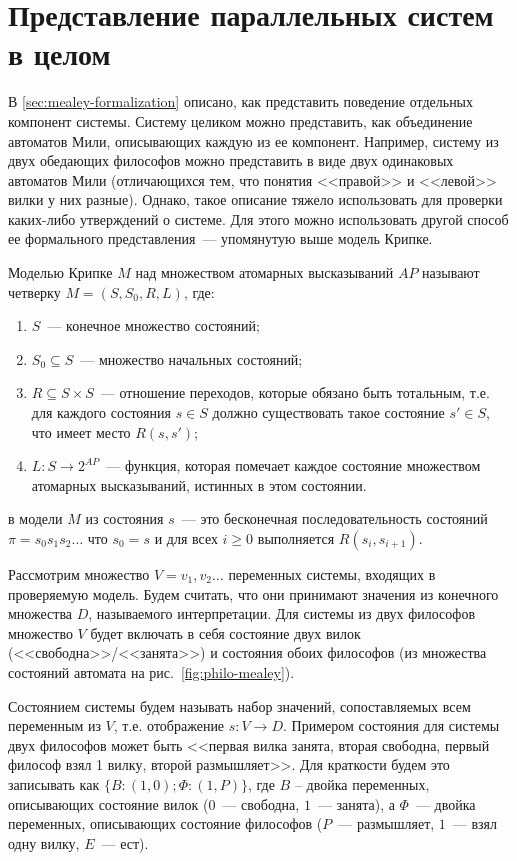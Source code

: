 \section{Представление параллельных систем в целом}
\label{sec:kripke-formalization}

В \ref{sec:mealey-formalization} описано, как представить поведение отдельных
компонент системы. Систему целиком можно представить, как объединение автоматов Мили,
описывающих каждую из ее компонент. Например, систему из двух обедающих философов можно
представить в виде двух одинаковых автоматов Мили (отличающихся тем, что понятия
<<правой>> и <<левой>> вилки у них разные). Однако, такое описание тяжело использовать для
проверки каких-либо утверждений о системе. Для этого можно использовать другой способ ее
формального представления~--- упомянутую выше модель Крипке.

Моделью Крипке $M$ над множеством атомарных высказываний $AP$ называют четверку $M=(S,
S_0, R, L)$, где:
\begin{enumerate}
\item $S$~--- конечное множество состояний;
\item $S_0 \subseteq S$~--- множество начальных состояний;
\item $R \subseteq S \times S$~--- отношение переходов, которые обязано быть тотальным,
  т.е. для каждого состояния $s \in S$ должно существовать такое состояние $s' \in S$, что
  имеет место $R(s, s')$;
\item $L: S \rightarrow 2^{AP}$~--- функция, которая помечает каждое состояние множеством
  атомарных высказываний, истинных в этом состоянии.
\end{enumerate}

 в модели $M$ из состояния $s$~--- это бесконечная последовательность состояний
$\pi = s_0s_1s_2 \ldots$ что $s_0 = s$ и для всех $i \geq 0$ выполняется $R(s_i,
s_{i+1})$.

Рассмотрим множество $V = {v_1, v_2 \ldots}$ переменных системы, входящих в проверяемую
модель. Будем считать, что они принимают значения из конечного множества $D$, называемого
 интерпретации. Для системы из двух философов множество $V$ будет включать в
себя состояние двух вилок (<<свободна>>/<<занята>>) и состояния обоих философов (из
множества состояний автомата на рис.~\ref{fig:philo-mealey}). 

Состоянием системы будем называть набор значений, сопоставляемых всем переменным из $V$,
т.е. отображение $s\colon V \rightarrow D$. Примером состояния для системы двух философов
может быть <<первая вилка занята, вторая свободна, первый философ взял 1 вилку, второй
размышляет>>. Для краткости будем это записывать как $\{B: (1, 0); \Phi: (1, P)\}$, где
$B$ -- двойка переменных, описывающих состояние вилок ($0$~--- свободна, $1$~--- занята),
а $\Phi$~--- двойка переменных, описывающих состояние философов ($P$~--- размышляет,
$1$~--- взял одну вилку, $E$~--- ест).

